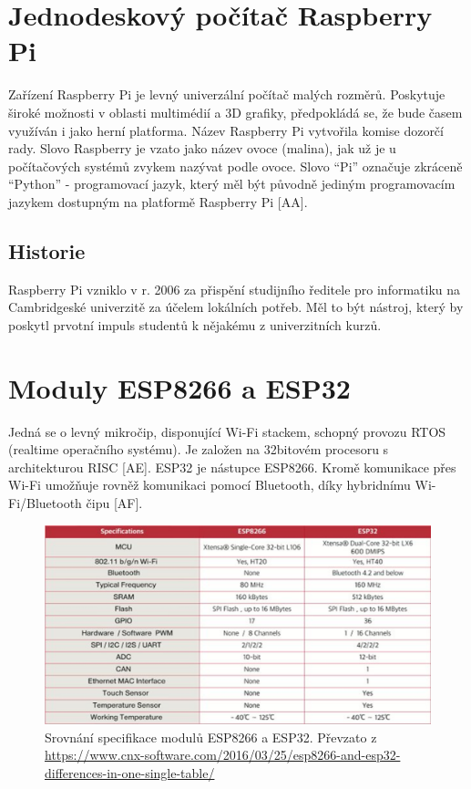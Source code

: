 \section{Jednodeskový počítač Raspberry Pi}
Zařízení Raspberry Pi je levný univerzální počítač malých rozměrů. Poskytuje široké možnosti v oblasti multimédií a 3D grafiky, předpokládá se, že bude časem využíván i jako herní platforma.\newline
Název Raspberry Pi vytvořila komise dozorčí rady. Slovo Raspberry je vzato jako název ovoce (malina), jak už je u počítačových systémů zvykem nazývat podle ovoce. Slovo “Pi” označuje zkráceně “Python” - programovací jazyk, který měl být původně jediným programovacím jazykem dostupným na platformě Raspberry Pi [AA].

\subsection*{Historie}
Raspberry Pi vzniklo v r. 2006 za přispění studijního ředitele pro informatiku na Cambridgeské univerzitě za účelem lokálních potřeb. Měl to být nástroj, který by poskytl prvotní impuls studentů k nějakému z univerzitních kurzů.

\section{Moduly ESP8266 a ESP32}
Jedná se o levný mikročip, disponující Wi-Fi stackem, schopný provozu RTOS (realtime operačního systému). Je založen na 32bitovém procesoru s architekturou RISC [AE]. \newline
ESP32 je nástupce ESP8266. Kromě komunikace přes Wi-Fi umožňuje rovněž komunikaci pomocí Bluetooth, díky hybridnímu Wi-Fi/Bluetooth čipu [AF]. 


\begin{figure}[hbt]
	\centering
	\includegraphics{obrazky/ESP.png}
	\caption{Srovnání specifikace modulů ESP8266 a ESP32. Převzato z \url{https://www.cnx-software.com/2016/03/25/esp8266-and-esp32-differences-in-one-single-table/}}
	\label{wifi-standards}
\end{figure}

